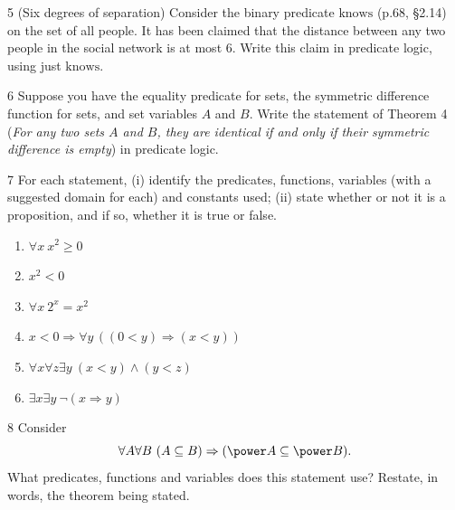 \begin{exercise}{5}
    (Six degrees of separation) Consider the binary predicate
    $\mathrm{knows}$ (p.68, \S2.14) on the set of all people. It has been claimed
    that the distance between any two people in the social network is at most 6.
    Write this claim in predicate logic, using just $\mathrm{knows}$.
\end{exercise}

\begin{exercise}{6}
    Suppose you have the equality predicate for sets, the symmetric difference
    function for sets, and set variables $A$ and $B$. Write the statement of
    Theorem 4 (\emph{For any two sets $A$ and $B$, they are identical if and
    only if their symmetric difference is empty}) in predicate logic.
\end{exercise}

\begin{exercise}{7}
    For each statement, (i) identify the predicates, functions, variables (with a
    suggested domain for each) and constants used; (ii) state whether or not it
    is a proposition, and if so, whether it is true or false.
    \begin{enumerate}[label=(\alph*)]
        \item $\forall x\ x^2\ge0$
        \item $x^2<0$
        \item $\forall x\ 2^x=x^2$
        \item $x<0\Rightarrow\forall y\,((0<y)\Rightarrow(x<y))$
        \item $\forall x\forall z\exists y\ (x<y)\wedge(y<z)$
        \item $\exists x\exists y\ \neg(x\Rightarrow y)$
    \end{enumerate}
\end{exercise}

\begin{exercise}{8}
    Consider
    \[
        \forall A\forall B\ (A\subseteq B)\Rightarrow(\power A\subseteq\power B).
    \]
    What predicates, functions and variables does this statement use? Restate,
    in words, the theorem being stated.
\end{exercise}

